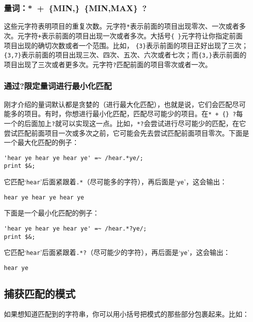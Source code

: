 \subsubsection{量词：*\ +\ \{MIN,\}\ \{MIN,MAX\}\ ?}
这些元字符表明项目的重复次数。元字符\verb|*|表示前面的项目出现零次、一次或者多次。元字符\verb|+|表示前面的项目出现一次或者多次。大括号\verb|{ }|元字符让你指定前面项目出现的确切次数或者一个范围。比如， \verb|{3}|表示前面的项目正好出现了三次；\verb|{3,7}|表示前面的项目出现三次、四次、五次、六次或者七次；而\verb|{3,}|表示前面的项目出现了三次或者更多次。元字符\verb|?|匹配前面的项目零次或者一次。

\subsubsection{通过?限定量词进行最小化匹配}
刚才介绍的量词默认都是贪婪的（进行最大化匹配），也就是说，它们会匹配尽可能多的项目。有时，你想进行最小化匹配，匹配尽可能少的项目。在\verb|* + {} ?|每一个的后面加上\verb|?|就可以实现这一点。比如，\verb|*?|会尝试进行尽可能少的匹配，在它尝试匹配前面项目一次或多次之前，它可能会先去尝试匹配前面项目零次。下面是一个最大化匹配的例子：

\begin{lstlisting}
'hear ye hear ye hear ye' =~ /hear.*ye/;
print $&;
\end{lstlisting}

它匹配`\verb|hear|'后面紧跟着\verb|.*|（尽可能多的字符），再后面是`\verb|ye|'，这会输出：

\begin{lstlisting}
hear ye hear ye hear ye
\end{lstlisting}

下面是一个最小化匹配的例子：

\begin{lstlisting}
'hear ye hear ye hear ye' =~ /hear.*?ye/;
print $&;
\end{lstlisting}

它匹配`\verb|hear|'后面紧跟着\verb|.*?|（尽可能少的字符），再后面是`\verb|ye|'，这会输出：

\begin{lstlisting}
hear ye
\end{lstlisting}

\subsection{捕获匹配的模式}
如果想知道匹配到的字符串，你可以用小括号把模式的那些部分包裹起来。比如：

